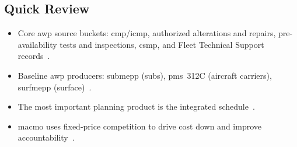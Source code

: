 \documentclass[../main.tex]{subfiles}
\begin{document}
\subsection{Quick Review}
\begin{itemize}
  \item Core \ac{awp} source buckets: \ac{cmp}/\ac{icmp}, authorized alterations and repairs, pre-availability tests and inspections, \ac{csmp}, and Fleet Technical Support records~\autocite{COMFLTFORCOMINST4790-3,edo-4-2-1-cno-availability-planning-2025}.
  \item Baseline \ac{awp} producers: \ac{submepp} (subs), \ac{pms}~312C (aircraft carriers), \ac{surfmepp} (surface)~\autocite{COMFLTFORCOMINST4790-3,edo-4-2-1-cno-availability-planning-2025}.
  \item The most important planning product is the integrated schedule~\autocite{edo-4-2-1-cno-availability-planning-2025}.
  \item \ac{macmo} uses fixed-price competition to drive cost down and improve accountability~\autocite{edo-4-2-1-cno-availability-planning-2025}.
\end{itemize}

\end{document}

